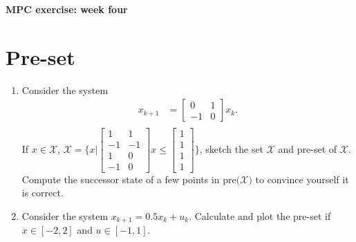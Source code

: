\newpage
\begin{center}
\normalfont\Large\bfseries MPC exercise: week four
\end{center}
\setcounter{section}{0}
\section{Pre-set}

\begin{enumerate}
    \item Consider the system 
\begin{align*}
    x_{k+1} &=\begin{bmatrix}
        0&1\\
        -1&0
    \end{bmatrix}x_k.\\
\end{align*}
If $x\in \mathcal{X}$, $\mathcal{X} =\{x| \begin{bmatrix}
        1&1\\
        -1&-1\\
        1&0\\
        -1&0
    \end{bmatrix}x\leq\begin{bmatrix}
        1\\
        1\\
        1\\
        1
    \end{bmatrix}\}$,
    sketch the set $\mathcal{X}$ and pre-set of $\mathcal{X}$. Compute the successor state of a few points in $\text{pre($\mathcal{X}$)}$ to convince yourself it is correct.\vspace{5\baselineskip}
    \item Consider the system $x_{k+1} = 0.5x_k + u_k$. Calculate and plot the pre-set if $x\in [-2, 2]$ and $u\in [-1,1]$.\vspace{5\baselineskip}
\end{enumerate}


